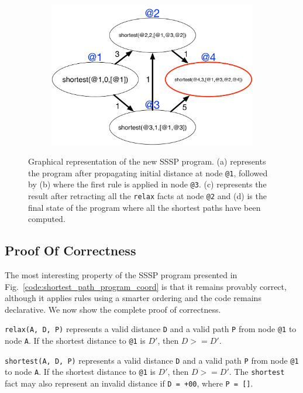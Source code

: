 \begin{figure}
\begin{center}
\begin{subfigure}[b]{0.4\textwidth}
      \caption{}
   \end{subfigure}
   \begin{subfigure}[b]{0.4\textwidth}
      \includegraphics[width=\textwidth]{figures/sssp/coord4}
      \caption{}
   \end{subfigure}
\end{center}
\caption{Graphical representation of the new SSSP program. (a) represents the
   program after propagating initial distance at node \texttt{@1}, followed by
   (b) where the first rule is applied in node \texttt{@3}. (c)
   represents the result after retracting all the \texttt{relax} facts at node
   \texttt{@2} and (d) is the final state of the program where all the shortest paths
   have been computed.}
\label{fig:coordination:new_sssp}
\end{figure}

\subsection{Proof Of Correctness}

The most interesting property of the SSSP program presented in
Fig.~\ref{code:shortest_path_program_coord} is that it remains provably correct,
although it applies rules using a smarter ordering and the code remains
declarative. We now show the complete proof of correctness.

\begin{invariant}[Distance]

\texttt{relax(A, D, P)} represents a valid distance \texttt{D} and a valid path
\texttt{P} from node \texttt{@1} to node \texttt{A}. If the shortest distance to
\texttt{@1} is $D'$, then $D >= D'$.

\texttt{shortest(A, D, P)} represents a valid distance \texttt{D} and a valid
path \texttt{P} from node \texttt{@1} to node \texttt{A}. If the shortest
distance to \texttt{@1} is $D'$, then $D >= D'$. The \texttt{shortest} fact may
also represent an invalid distance if \texttt{D = +00}, where \texttt{P = []}.

\end{invariant}


